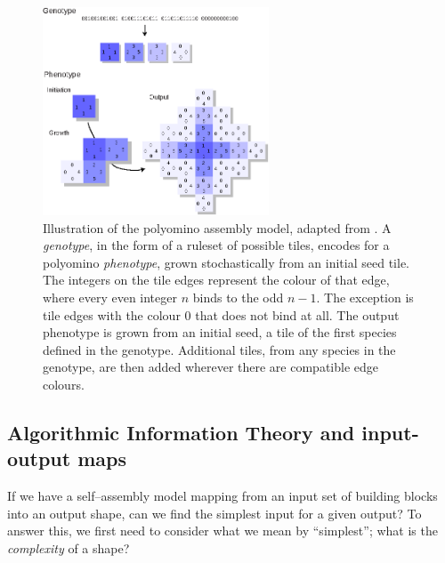 \begin{figure}[h]
    \centering
    \includegraphics[width=0.6\textwidth]{figures/polyominoes.eps}
    \caption{Illustration of the polyomino assembly model, adapted from \cite{johnston2011evolutionary}. A \emph{genotype}, in the form of a ruleset of possible tiles, encodes for a polyomino \emph{phenotype}, grown stochastically from an initial seed tile. The integers on the tile edges represent the colour of that edge, where every even integer \(n\) binds to the odd \(n-1\). The exception is tile edges with the colour \(0\) that does not bind at all. The output phenotype is grown from an initial seed, a tile of the first species defined in the genotype. Additional tiles, from any species in the genotype, are then added wherever there are compatible edge colours.}
    \label{fig:polyominoes}
\end{figure}

\subsection{Algorithmic Information Theory and input-output maps}
\label{sec:AIT}




If we have a self--assembly model mapping from an input set of building blocks into an output shape, can we find the simplest input for a given output? To answer this, we first need to consider what we mean by ``simplest''; what is the \emph{complexity} of a shape?

